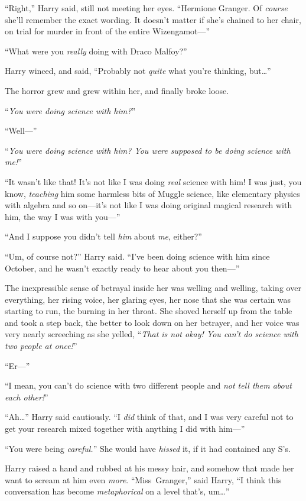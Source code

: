 “Right,” Harry said, still not meeting her eyes. “Hermione Granger. Of \emph{course} she’ll remember the exact wording. It doesn’t matter if she’s chained to her chair, on trial for murder in front of the entire Wizengamot—”

“What were you \emph{really} doing with Draco Malfoy?”

Harry winced, and said, “Probably not \emph{quite} what you’re thinking, but…”

The horror grew and grew within her, and finally broke loose.

“\emph{You were doing \emph{science} with him?}”

“Well—”

“\emph{You were doing \emph{science} with him? You were supposed to be doing science with \emph{me}!}”

“It wasn’t like that! It’s not like I was doing \emph{real} science with him! I was just, you know, \emph{teaching} him some harmless bits of Muggle science, like elementary physics with algebra and so on—it’s not like I was doing original magical research with him, the way I was with you—”

“And I suppose you didn’t tell \emph{him} about \emph{me}, either?”

“Um, of course not?” Harry said. “I’ve been doing science with him since October, and he wasn’t exactly ready to hear about you then—”

The inexpressible sense of betrayal inside her was welling and welling, taking over everything, her rising voice, her glaring eyes, her nose that she was certain was starting to run, the burning in her throat. She shoved herself up from the table and took a step back, the better to look down on her betrayer, and her voice was very nearly screeching as she yelled, “\emph{That is not okay! You can’t do science with two people at once!}”

“Er—”

“I mean, you can’t do science with two different people and \emph{not tell them about each other!}”

“Ah…” Harry said cautiously. “I \emph{did} think of that, and I was very careful not to get your research mixed together with anything I did with him—”

“You were being \emph{careful.}” She would have \emph{hissed} it, if it had contained any S’s.

Harry raised a hand and rubbed at his messy hair, and somehow that made her want to scream at him even \emph{more}. “Miss~Granger,” said Harry, “I think this conversation has become \emph{metaphorical} on a level that’s, um…”


